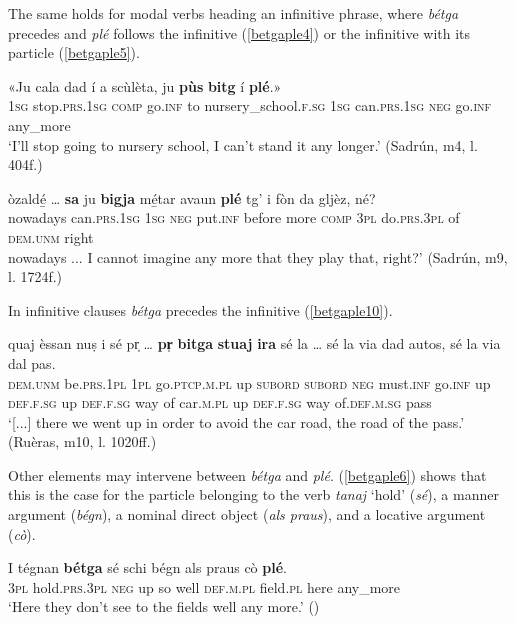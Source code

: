The same holds for modal verbs heading an infinitive phrase, where \textit{bétga} precedes and \textit{plé} follows the infinitive (\ref{betgaple4}) or the infinitive with its particle (\ref{betgaple5}).

\ea
\label{betgaple4}
\gll  «Ju cala dad í a scùlèta, ju \textbf{pùs} \textbf{bitg} í \textbf{plé}.»\\
\textsc{1sg} stop.\textsc{prs.1sg} \textsc{comp} go.\textsc{inf} to nursery\_school.\textsc{f.sg} \textsc{1sg} can.\textsc{prs.1sg} \textsc{neg} go.\textsc{inf} any\_more  \\
\glt `I’ll stop going to nursery school, I can’t stand it any longer.' (Sadrún, m4, l. 404f.)
\z

\ea
\label{betgaple5}
\gll [...] òzaldé̱ … \textbf{sa} ju \textbf{bigja} mé̱tar avaun \textbf{plé} tg’ i fòn da gljèz, né?    \\
{} nowadays {} can.\textsc{prs.1sg} \textsc{1sg} \textsc{neg} put.\textsc{inf} before more \textsc{comp} \textsc{3pl} do.\textsc{prs.3pl} of \textsc{dem.unm} right \\
\glt [...] nowadays ... I cannot imagine any more that they play that, right?' (Sadrún, m9, l. 1724f.)
\z

In infinitive clauses \textit{bétga} precedes the infinitive (\ref{betgaple10}).

\ea
\label{betgaple10}
\gll  [...] quaj èssan nuṣ i sé pr̩ … \textbf{pr̩} \textbf{bitga} \textbf{stuaj} \textbf{ira} sé la … sé la via dad autos, sé la via dal pas. \\
{} \textsc{dem.unm} be.\textsc{prs.1pl} \textsc{1pl} go.\textsc{ptcp.m.pl} up \textsc{subord} {} \textsc{subord} \textsc{neg} must.\textsc{inf} go.\textsc{inf} up \textsc{def.f.sg} {} up \textsc{def.f.sg} way of car.\textsc{m.pl} up \textsc{def.f.sg} way of.\textsc{def.m.sg} pass  \\
\glt `[...] there we went up in order to avoid the car road, the road of the pass.' (Ruèras, m10, l. 1020ff.)
\z

Other elements may intervene between \textit{bétga} and \textit{plé}. (\ref{betgaple6}) shows that this is the case for the particle belonging to the verb \textit{tanaj} `hold' (\textit{sé}), a manner argument (\textit{bégn}), a nominal direct object (\textit{als praus}), and a locative argument (\textit{cò}).

\ea
\label{betgaple6}
\gll   I tégnan \textbf{bétga} sé schi bégn als praus cò \textbf{plé}. \\
\textsc{3pl} hold.\textsc{prs.3pl} \textsc{neg} up so well \textsc{def.m.pl} field.\textsc{pl} here any\_more \\
\glt `Here they don’t see to the fields well any more.' (\citealt[69]{Berther2007})
\z

